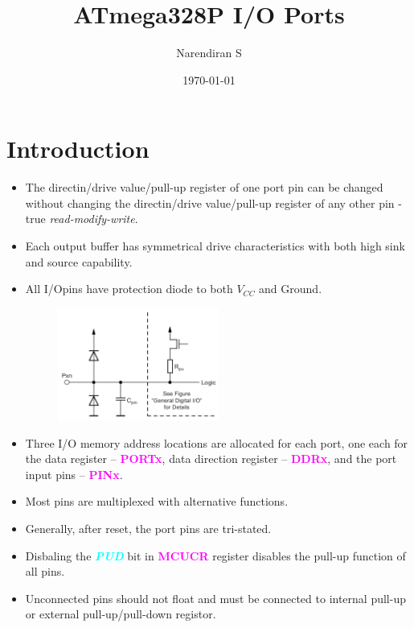 \documentclass{article}
\title{ATmega328P I/O Ports}
\author{Narendiran S}
\date{\today}
\newcommand{\bitFormat}[1]{\emph{\textbf{\textcolor{cyan}{#1}}}}
\newcommand{\regFormat}[1]{\textbf{\textcolor{magenta}{#1}}}
\begin{document}
\maketitle

\section{Introduction}
\begin{itemize}
    \item The directin/drive value/pull-up register of one port pin can be changed without changing the directin/drive value/pull-up register  of any other pin - true \emph{read-modify-write}.
    \item Each output buffer has symmetrical drive characteristics with both high sink and source capability.
    \item All I/Opins have protection diode to both $V_{CC}$ and Ground.
    \begin{figure}[H]
        \begin{center}
            \includegraphics[width=0.5\textwidth]{IOpinEquivalent.png}
        \end{center}
    \end{figure}
    \item Three I/O memory address locations are allocated for each port, one each for the data register – \regFormat{PORTx}, data direction register – \regFormat{DDRx}, and the port input pins – \regFormat{PINx}.
    \item Most pins are multiplexed with alternative functions.
    \item Generally, after reset, the port pins are tri-stated.
    \item Disbaling the \bitFormat{PUD} bit in \regFormat{MCUCR} register disables the pull-up function of all pins.
    \item Unconnected pins should not float and must be connected to internal pull-up or external pull-up/pull-down registor.
\end{itemize}
\end{document}
